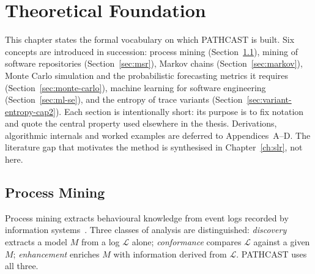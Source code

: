 
\chapter{Theoretical Foundation}
\label{ch:theoretical-foundation}

This chapter states the formal vocabulary on which PATHCAST is built. Six
concepts are introduced in succession: process mining
(Section~\ref{sec:process-mining}), mining of software repositories
(Section~\ref{sec:msr}), Markov chains (Section~\ref{sec:markov}), Monte
Carlo simulation and the probabilistic forecasting metrics it requires
(Section~\ref{sec:monte-carlo}), machine learning for software engineering
(Section~\ref{sec:ml-se}), and the entropy of trace variants
(Section~\ref{sec:variant-entropy-cap2}). Each section is intentionally short:
its purpose is to fix notation and quote the central property used elsewhere in
the thesis. Derivations, algorithmic internals and worked examples are
deferred to Appendices~A--D. The literature gap that motivates the method is
synthesised in Chapter~\ref{ch:slr}, not here.


\section{Process Mining}
\label{sec:process-mining}

Process mining extracts behavioural knowledge from event logs recorded by
information systems~\cite{aalst2016process}. Three classes of analysis are
distinguished: \emph{discovery} extracts a model $M$ from a log
$\mathcal{L}$ alone; \emph{conformance} compares $\mathcal{L}$ against a
given $M$; \emph{enhancement} enriches $M$ with information derived from
$\mathcal{L}$. PATHCAST uses all three.

